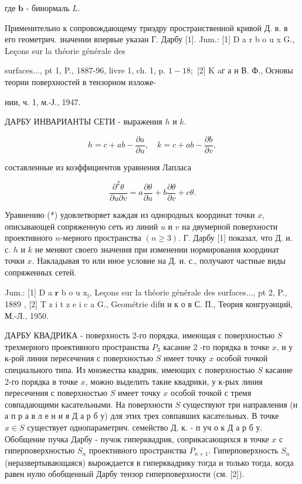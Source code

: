 \documentclass[10pt]{article}
\begin{document}
где $\boldsymbol{b}$ - бинормаль $L$.



Применительно к сопровождающему триэдру пространственной кривой Д. в. в его геометрич. значении впервые указан Г. Дарбу [1]. Jum.: [1] D a r b o u x G., Leçons sur la théorie générale des

surfaces..., pt 1, P., 1887-96, livre 1, ch. 1, p. $1-18 ;$ [2] K aг а н В. Ф., Основы теории поверхностей в тензорном изложе-

нии, ч. 1, м.-Ј., 1947.



ДАРБУ ИНВАРИАНТЫ СЕТИ - выражения $h$ и $k$.



\[

h=c+a b-\frac{\partial a}{\partial u}, \quad k=c+a b-\frac{\partial b}{\partial v},

\]



составленные из коэффициентов уравнения Лапласа



\[

\frac{\partial^{2} \theta}{\partial u \partial v}=a \frac{\partial \theta}{\partial u}+b \frac{\partial \theta}{\partial v}+c \theta .

\]



Уравнению (*) удовлетворяет каждая из однородных координат точки $x$, описывающей сопряженную сеть из линий $u$ и $v$ на двумерной поверхности проективного $n$-мерного пространства $(n \geqslant 3)$. Г. Дарбу [1] показал, что Д. и. с. $h$ и $k$ не меняют своего значения при изменении нормирования координат точки $x$. Накладывая то или иное условие на Д. и. с., получают частные виды сопряженных сетей.



Jum.: [1] D a $\mathbf{r}$ b o u $\mathrm{x}_{\mathrm{j}}$, Leçons sur la théorie générale des surfaces..., pt 2, P., 1889 , [2] T $\mathrm{z}$ i t z e i c a G., Geométrie difн и к о в С. П., Теория конгруәнций, М.-Л., 1950.



ДАРБУ КВАДРИКА - поверхность 2-го порядка, имеющая с поверхностью $S$ трехмерного проективного пространства $P_{3}$ касание 2 -го порядка в точке $x$, и у к-рой линия пересечения с поверхностью $S$ имеет точку $x$ особой точкой специального типа. Из множества квадрик, имеющих с поверхностью $S$ касание 2-го порядка в точке $x$, можно выделить такие квадрики, у к-рых линия пересечения с поверхностью $S$ имеет точку $x$ особой точкой с тремя совпадающими касательными. На поверхности $S$ существуют три направления (н а п р а в л е н и я Д а р б у) для этих трех совпавших касательных. В точке $x \in S$ существует однопараметрич. семейство Д. к. - п уч о к Д а р б у. Обобщение пучка Дарбу - пучок гиперквадрик, соприкасающихся в точке $x$ с гиперповерхностью $S_{n}$ проективного пространства $P_{n+1}$. Гиперповерхность $S_{n}$ (неразвертывающаяся) вырождается в гиперквадрику тогда и только тогда, когда равен нулю обобщенный Дарбу тензор гиперповерхности (см. [2]).
\end{document}
